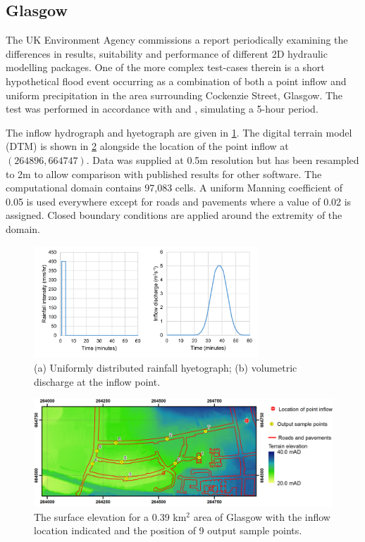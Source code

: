 \documentclass[11pt,english,a4paper]{article}
\begin{document}
\subsection{Glasgow}

The UK Environment Agency commissions a report periodically examining the differences in results, suitability and performance of different 2D hydraulic modelling packages. One of the more complex test-cases therein is a short hypothetical flood event occurring as a combination of both a point inflow and uniform precipitation in the area surrounding Cockenzie Street, Glasgow. The test was performed in accordance with \citet{Pender2010} and \citet{Pender2013}, simulating a 5-hour period.

The inflow hydrograph and hyetograph are given in \ref{Glasgow_Inflows}. The digital terrain model (DTM) is shown in \ref{Glasgow_DTM} alongside the location of the point inflow at $(264896, 664747)$. Data was supplied at 0.5m resolution but has been resampled to 2m to allow comparison with published results for other software. The computational domain contains 97,083 cells. A uniform Manning coefficient of 0.05 is used everywhere except for roads and pavements where a value of 0.02 is assigned. Closed boundary conditions are applied around the extremity of the domain. 

\begin{figure}[tpb]
\centering
\includegraphics[width=0.75\textwidth]{Glasgow_Inflow.png}
\caption{(a) Uniformly distributed rainfall hyetograph; (b) volumetric discharge at the inflow point.}
\label{Glasgow_Inflows}
\end{figure}
\begin{figure}[tpb]
\centering
\includegraphics[width=1.0\textwidth]{Glasgow_DTM.png}
\caption{The surface elevation for a 0.39 km$^{2}$ area of Glasgow with the inflow location indicated and the position of 9 output sample points.}
\label{Glasgow_DTM}
\end{figure}
\end{document}

